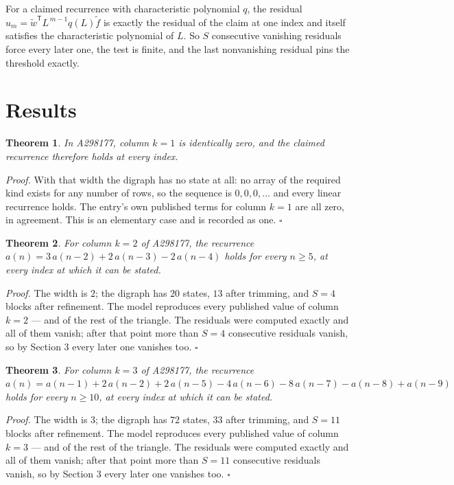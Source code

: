 \documentclass[11pt]{article}
\newtheorem{theorem}{Theorem}
\theoremstyle{definition}
\begin{document}
For a claimed recurrence with characteristic polynomial $q$, the residual $u_m = \tilde w^{\mathsf T}L^{\,m-1}q(L)\tilde f$ is exactly the residual of the claim at one index and itself satisfies the characteristic polynomial of $L$. So $S$ consecutive vanishing residuals force every later one, the test is finite, and the last nonvanishing residual pins the threshold exactly.

\section{Results}

\begin{theorem} In A298177, column $k = 1$ is identically zero, and the claimed recurrence therefore holds at every index.\end{theorem}

{\itshape Proof.} With that width the digraph has no state at all: no array of the required kind exists for any number of rows, so the sequence is $0,0,0,\dots$ and every linear recurrence holds. The entry's own published terms for column $k = 1$ are all zero, in agreement. This is an elementary case and is recorded as one. $\square$

\begin{theorem} For column $k = 2$ of A298177, the recurrence $a(n) = 3\,a(n-2) + 2\,a(n-3) - 2\,a(n-4)$ holds for every $n \ge 5$, at every index at which it can be stated.\end{theorem}

{\itshape Proof.} The width is $2$; the digraph has $20$ states, $13$ after trimming, and $S = 4$ blocks after refinement. The model reproduces every published value of column $k = 2$ --- and of the rest of the triangle. The residuals were computed exactly and all of them vanish; after that point more than $S = 4$ consecutive residuals vanish, so by Section 3 every later one vanishes too. $\square$

\begin{theorem} For column $k = 3$ of A298177, the recurrence $a(n) = a(n-1) + 2\,a(n-2) + 2\,a(n-5) - 4\,a(n-6) - 8\,a(n-7) - a(n-8) + a(n-9)$ holds for every $n \ge 10$, at every index at which it can be stated.\end{theorem}

{\itshape Proof.} The width is $3$; the digraph has $72$ states, $33$ after trimming, and $S = 11$ blocks after refinement. The model reproduces every published value of column $k = 3$ --- and of the rest of the triangle. The residuals were computed exactly and all of them vanish; after that point more than $S = 11$ consecutive residuals vanish, so by Section 3 every later one vanishes too. $\square$
\end{document}
